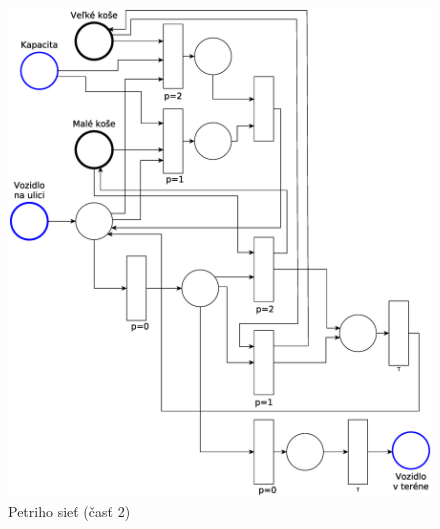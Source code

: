 \documentclass[11pt,a4paper]{article}
\begin{document}
\begin{figure}[H]
    \center
    \includegraphics[scale=0.4]{../pn/pn-part2.eps}
    \caption{Petriho sieť (časť 2)}
    \label{PN-P2}
\end{figure}

\newpage %

\makeatletter
\makeatother

\begin{flushleft}
    
\end{flushleft}
\end{document}
